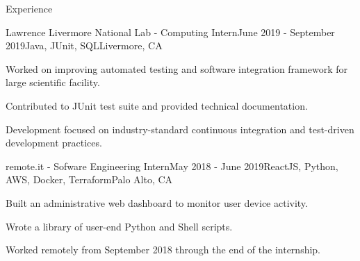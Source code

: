 \documentclass{resume} %
\begin{document}

\begin{rSection}{Experience}
    \begin{rSubsection}{Lawrence Livermore National Lab - Computing Intern}{June 2019 - September 2019}{Java, JUnit, SQL}{Livermore, CA}
        \item Worked on improving automated testing and software integration framework for large scientific facility.
        \item Contributed to JUnit test suite and provided technical documentation.
        \item Development focused on industry-standard continuous integration and test-driven development practices.
    \end{rSubsection}

    \begin{rSubsection}{remote.it - Sofware Engineering Intern}{May 2018 - June 2019}{ReactJS, Python, AWS, Docker, Terraform}{Palo Alto, CA}
        \item Built an administrative web dashboard to monitor user device activity.
        \item Wrote a library of user-end Python and Shell scripts.
        \item Worked remotely from September 2018 through the end of the internship.
    \end{rSubsection}

\end{rSection}

\end{document}
